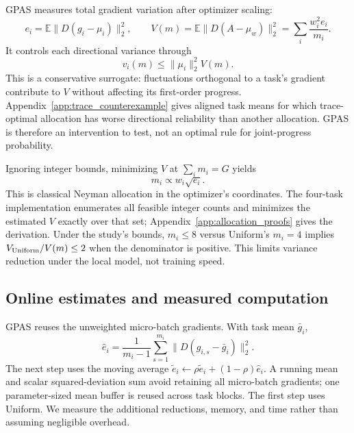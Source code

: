 GPAS measures total gradient variation after optimizer scaling:
\begin{equation}
    e_i=\mathbb E\|D(g_i-\mu_i)\|_2^2,\qquad
    V(m)=\mathbb E\|D(A-\mu_w)\|_2^2
         =\sum_i\frac{w_i^2e_i}{m_i}.
    \label{eq:batch_variance}
\end{equation}
It controls each directional variance through
\begin{equation}
    v_i(m)\leq\|\mu_i\|_2^2 V(m).
    \label{eq:trace_directional_bound}
\end{equation}
This is a conservative surrogate: fluctuations orthogonal to a task's
gradient contribute to $V$ without affecting its first-order progress.
Appendix~\ref{app:trace_counterexample} gives aligned task means for
which trace-optimal allocation has worse directional reliability than
another allocation. GPAS is therefore an intervention to test, not an
optimal rule for joint-progress probability.

Ignoring integer bounds, minimizing $V$ at $\sum_i m_i=G$ yields
\begin{equation}
    m_i\propto w_i\sqrt{e_i}.
    \label{eq:batch_gpas_allocation}
\end{equation}
This is classical Neyman allocation
\citep{neyman1934representative,cochran1977sampling} in the optimizer's
coordinates. The four-task implementation enumerates all feasible
integer counts and minimizes the estimated $V$ exactly over that set;
Appendix~\ref{app:allocation_proofs} gives the derivation. Under the
study's bounds, $m_i\leq8$ versus Uniform's $m_i=4$ implies
$V_{\rm Uniform}/V(m)\leq2$ when the denominator is positive.
This limits variance reduction under the local model, not training speed.

\subsection{Online estimates and measured computation}
\label{sec:online_estimates}

GPAS reuses the unweighted micro-batch gradients. With task mean $\bar g_i$,
\begin{equation}
    \widehat e_i=\frac1{m_i-1}\sum_{s=1}^{m_i}
                    \|D(g_{i,s}-\bar g_i)\|_2^2.
    \label{eq:noise_estimate}
\end{equation}
The next step uses the moving average
$\widetilde e_i\leftarrow\rho\widetilde e_i+(1-\rho)\widehat e_i$.
A running mean and scalar squared-deviation sum avoid retaining all
micro-batch gradients; one parameter-sized mean buffer is reused across
task blocks. The first step uses Uniform. We measure the additional
reductions, memory, and time rather than assuming negligible overhead.

